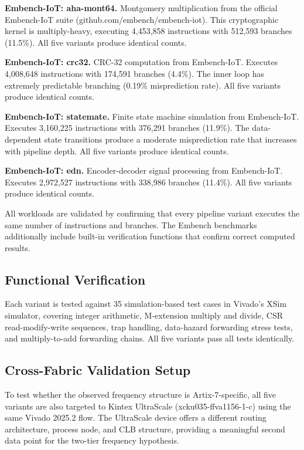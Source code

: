 \documentclass[journal]{IEEEtran}
\begin{document}
\begin{table}[t]
\begin{table}[t]
\textbf{Embench-IoT: aha-mont64.} Montgomery multiplication from the official Embench-IoT suite (github.com/embench/embench-iot). This cryptographic kernel is multiply-heavy, executing 4{,}453{,}858 instructions with 512{,}593 branches (11.5\%). All five variants produce identical counts.

\textbf{Embench-IoT: crc32.} CRC-32 computation from Embench-IoT. Executes 4{,}008{,}648 instructions with 174{,}591 branches (4.4\%). The inner loop has extremely predictable branching (0.19\% misprediction rate). All five variants produce identical counts.

\textbf{Embench-IoT: statemate.} Finite state machine simulation from Embench-IoT. Executes 3{,}160{,}225 instructions with 376{,}291 branches (11.9\%). The data-dependent state transitions produce a moderate misprediction rate that increases with pipeline depth. All five variants produce identical counts.

\textbf{Embench-IoT: edn.} Encoder-decoder signal processing from Embench-IoT. Executes 2{,}972{,}527 instructions with 338{,}986 branches (11.4\%). All five variants produce identical counts.

All workloads are validated by confirming that every pipeline variant executes the same number of instructions and branches. The Embench benchmarks additionally include built-in verification functions that confirm correct computed results.

\subsection{Functional Verification}

Each variant is tested against 35 simulation-based test cases in Vivado's XSim simulator, covering integer arithmetic, M-extension multiply and divide, CSR read-modify-write sequences, trap handling, data-hazard forwarding stress tests, and multiply-to-add forwarding chains. All five variants pass all tests identically.

\subsection{Cross-Fabric Validation Setup}
\label{sec:crossfabric_setup}

To test whether the observed frequency structure is Artix-7-specific, all five variants are also targeted to Kintex UltraScale (xcku035-ffva1156-1-c) using the same Vivado 2025.2 flow. The UltraScale device offers a different routing architecture, process node, and CLB structure, providing a meaningful second data point for the two-tier frequency hypothesis.


\end{table}
\end{table}
\end{document}
